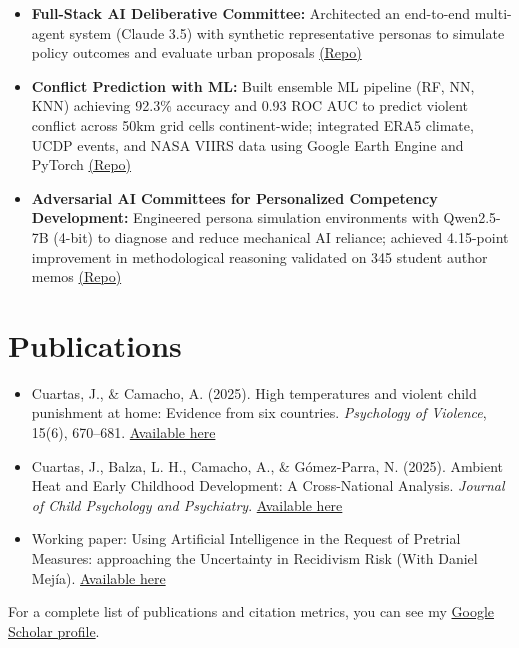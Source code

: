 \documentclass[10pt]{article}
\newenvironment{cvitems}{%
  \begin{itemize}[
    leftmargin=1.2em,
    itemsep=0pt,
    parsep=0pt,
    topsep=1pt,
    label={$\bullet$}]%
}{\end{itemize}}
\begin{document}
\begin{cvitems}
  \item \textbf{Full-Stack AI Deliberative Committee:} Architected an end-to-end multi-agent system (Claude 3.5) with synthetic representative personas to simulate policy outcomes and evaluate urban proposals \href{https://github.com/anfelipecb/AI-Augmetnted-Deliberative-Committee}{(Repo)}
  \item \textbf{Conflict Prediction with ML:} Built ensemble ML pipeline (RF, NN, KNN) achieving 92.3\% accuracy and 0.93 ROC AUC to predict violent conflict across 50km grid cells continent-wide; integrated ERA5 climate, UCDP events, and NASA VIIRS data using Google Earth Engine and PyTorch \href{https://github.com/anfelipecb/conflict-prediction-ml}{(Repo)}
  \item \textbf{Adversarial AI Committees for Personalized Competency Development:} Engineered persona simulation environments with Qwen2.5-7B (4-bit) to diagnose and reduce mechanical AI reliance; achieved 4.15-point improvement in methodological reasoning validated on 345 student author memos \href{https://github.com/anfelipecb/AI-Agents-Final-Project}{(Repo)}
\end{cvitems}

\section{Publications}

\begin{cvitems}
  \item Cuartas, J., \& Camacho, A. (2025). High temperatures and violent child punishment at home: Evidence from six countries. \textit{Psychology of Violence}, 15(6), 670--681. \href{https://psycnet.apa.org/record/2026-64418-001}{Available here}
  \item Cuartas, J., Balza, L. H., Camacho, A., \& Gómez-Parra, N. (2025). Ambient Heat and Early Childhood Development: A Cross-National Analysis. \textit{Journal of Child Psychology and Psychiatry}. \href{https://acamh.onlinelibrary.wiley.com/share/RVGWC3NCQNFQ4ARNAUFI?target=10.1111/jcpp.70081}{Available here}
  \item Working paper: Using Artificial Intelligence in the Request of Pretrial Measures: approaching the Uncertainty in Recidivism Risk (With Daniel Mejía). \href{https://anfelipecb.github.io/assets/pdf/Prisma\%20Paper\%20VEng.pdf}{Available here}
\end{cvitems}

\vspace{1pt}
For a complete list of publications and citation metrics, you can see my \href{https://scholar.google.com/citations?user=-dF0xsAAAAAJ&hl=en}{Google Scholar profile}.

\end{document}
